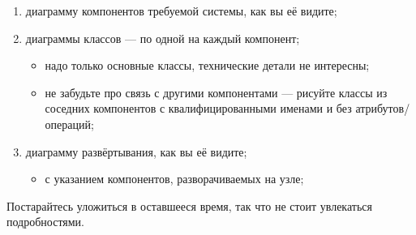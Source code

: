 \documentclass[a5paper]{article}
\begin{document}
\begin{enumerate}
    \item диаграмму компонентов требуемой системы, как вы её видите;
    \item диаграммы классов --- по одной на каждый компонент;
    \begin{itemize}
        \item надо только основные классы, технические детали не интересны;
        \item не забудьте про связь с другими компонентами --- рисуйте классы из соседних компонентов с квалифицированными именами и без атрибутов/операций;
    \end{itemize}
    \item диаграмму развёртывания, как вы её видите;
    \begin{itemize}
        \item с указанием компонентов, разворачиваемых на узле;
    \end{itemize}
\end{enumerate}

Постарайтесь уложиться в оставшееся время, так что не стоит увлекаться подробностями.
\end{document}
